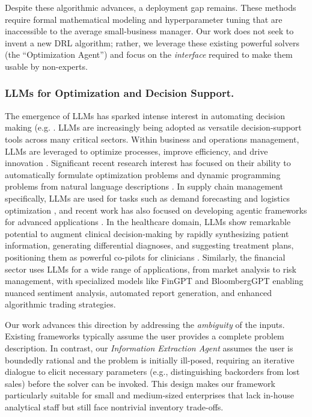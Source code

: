 Despite these algorithmic advances, a deployment gap remains. These methods require formal mathematical modeling and hyperparameter tuning that are inaccessible to the average small-business manager. Our work does not seek to invent a new DRL algorithm; rather, we leverage these existing powerful solvers (the ``Optimization Agent'') and focus on the \emph{interface} required to make them usable by non-experts.

\subsubsection{LLMs for Optimization and Decision Support.}
The emergence of LLMs has sparked intense interest in automating decision making (e.g. \cite{huang2025orlm}. LLMs are increasingly being adopted as versatile decision-support tools across many critical sectors. Within business and operations management, LLMs are leveraged to optimize processes, improve efficiency, and drive innovation \citep{li2024large}. Significant recent research interest has focused on their ability to automatically formulate optimization problems and dynamic programming problems from natural language descriptions \citep{ahmaditeshnizi2023optimus,ahmaditeshnizi2024optimus,zhou2025auto,liang2025llm}. In supply chain management specifically, LLMs are used for tasks such as demand forecasting and logistics optimization \citep{lu2024optimizing}, and recent work has also focused on developing agentic frameworks for advanced applications \citep{quan2024invagent,qi2025leveraging,long2025autonomous,simchi2026large,cohen2025supply}. In the healthcare domain, LLMs show remarkable potential to augment clinical decision-making by rapidly synthesizing patient information, generating differential diagnoses, and suggesting treatment plans, positioning them as powerful co-pilots for clinicians \citep{shah2023creation,nazi2024large}. Similarly, the financial sector uses LLMs for a wide range of applications, from market analysis to risk management, with specialized models like FinGPT and BloombergGPT enabling nuanced sentiment analysis, automated report generation, and enhanced algorithmic trading strategies.

Our work advances this direction by addressing the \emph{ambiguity} of the inputs. Existing frameworks typically assume the user provides a complete problem description. In contrast, our \emph{Information Extraction Agent} assumes the user is boundedly rational and the problem is initially ill-posed, requiring an iterative dialogue to elicit necessary parameters (e.g., distinguishing backorders from lost sales) before the solver can be invoked. This design makes our framework particularly suitable for small and medium-sized enterprises that lack in-house analytical staff but still face nontrivial inventory trade-offs. 




